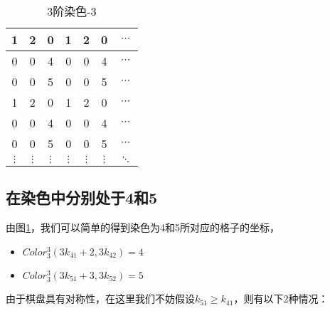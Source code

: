 \begin{table}[htbp]
	\centering
	\caption{3阶染色-3}
	\begin{tabular}{|c|c|c|c|c|c|c|}
		\hline
		1        & 2        & 0        & 1        & 2        & 0        & $\cdots$ \\
		\hline
		0        & 0        & 4        & 0        & 0        & 4        & $\cdots$ \\
		\hline
		0        & 0        & 5        & 0        & 0        & 5        & $\cdots$ \\
		\hline
		1        & 2        & 0        & 1        & 2        & 0        & $\cdots$ \\
		\hline
		0        & 0        & 4        & 0        & 0        & 4        & $\cdots$ \\
		\hline
		0        & 0        & 5        & 0        & 0        & 5        & $\cdots$ \\
		\hline
		$\vdots$ & $\vdots$ & $\vdots$ & $\vdots$ & $\vdots$ & $\vdots$ & $\ddots$ \\
		\hline
	\end{tabular}
	\label{fig:3-order-staining-last}
\end{table}

\subsection{在染色中分别处于4和5}

由图\ref{fig:3-order-staining-last}，我们可以简单的得到染色为4和5所对应的格子的坐标，

\begin{itemize}
	\item $Color^3_3(3k_{41} + 2, 3k_{42}) = 4$
	\item $Color^3_3(3k_{51} + 3, 3k_{52}) = 5$
\end{itemize}

由于棋盘具有对称性，在这里我们不妨假设$k_{51} \ge k_{41}$，则有以下2种情况：

